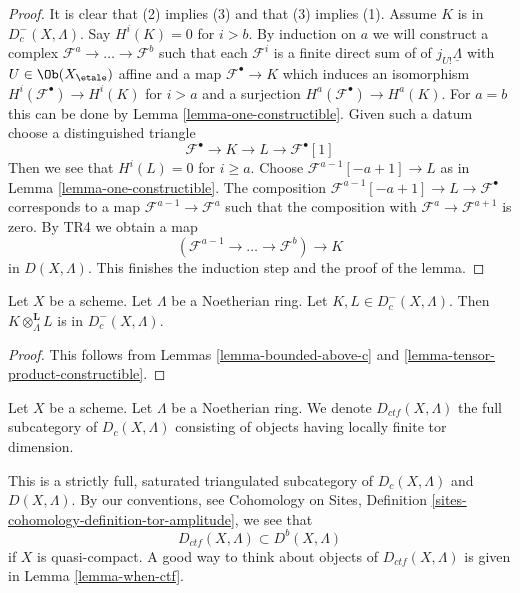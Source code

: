 \begin{proof}
It is clear that (2) implies (3) and that (3) implies (1).
Assume $K$ is in $D_c^-(X, \Lambda)$.
Say $H^i(K) = 0$ for $i > b$. By induction on $a$
we will construct a complex $\mathcal{F}^a \to \ldots \to \mathcal{F}^b$
such that each $\mathcal{F}^i$ is a finite direct sum of
of $j_{U!}\underline{\Lambda}$ with $U \in \Ob(X_\etale)$ affine
and a map $\mathcal{F}^\bullet \to K$ which induces an isomorphism
$H^i(\mathcal{F}^\bullet) \to H^i(K)$ for $i > a$ and a surjection
$H^a(\mathcal{F}^\bullet) \to H^a(K)$.
For $a = b$ this can be done by Lemma \ref{lemma-one-constructible}.
Given such a datum choose a distinguished triangle
$$
\mathcal{F}^\bullet \to K \to L \to \mathcal{F}^\bullet[1]
$$
Then we see that $H^i(L) = 0$ for $i \geq a$. Choose
$\mathcal{F}^{a - 1}[-a +1] \to L$ as in
Lemma \ref{lemma-one-constructible}. The composition
$\mathcal{F}^{a - 1}[-a +1] \to L \to \mathcal{F}^\bullet$
corresponds to a map $\mathcal{F}^{a - 1} \to \mathcal{F}^a$
such that the composition with $\mathcal{F}^a \to \mathcal{F}^{a + 1}$
is zero. By TR4 we obtain a map
$$
(\mathcal{F}^{a - 1} \to \ldots \to \mathcal{F}^b) \to K
$$
in $D(X, \Lambda)$. This finishes the induction step and the
proof of the lemma.
\end{proof}

\begin{lemma}
\label{lemma-tensor-c}
Let $X$ be a scheme. Let $\Lambda$ be a Noetherian ring.
Let $K, L \in D_c^-(X, \Lambda)$. Then
$K \otimes_\Lambda^\mathbf{L} L$ is in $D_c^-(X, \Lambda)$.
\end{lemma}

\begin{proof}
This follows from Lemmas \ref{lemma-bounded-above-c} and
\ref{lemma-tensor-product-constructible}.
\end{proof}

\begin{definition}
\label{definition-ctf}
Let $X$ be a scheme. Let $\Lambda$ be a Noetherian ring. We denote
{\it $D_{ctf}(X, \Lambda)$} the full subcategory of $D_c(X, \Lambda)$
consisting of objects having locally finite tor dimension.
\end{definition}

\noindent
This is a strictly full, saturated triangulated subcategory of
$D_c(X, \Lambda)$ and $D(X, \Lambda)$. By our conventions, see
Cohomology on Sites, Definition \ref{sites-cohomology-definition-tor-amplitude},
we see that
$$
D_{ctf}(X, \Lambda) \subset D^b(X, \Lambda)
$$
if $X$ is quasi-compact. A good way to think about objects of
$D_{ctf}(X, \Lambda)$ is given in Lemma \ref{lemma-when-ctf}.

